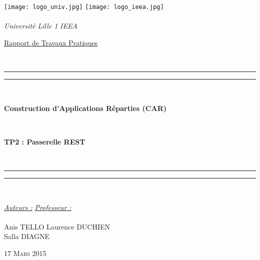 \thispagestyle{cover}

\texttt{[image: logo\_univ.jpg]} \hfill \texttt{[image: logo\_ieea.jpg]} \\
~\\
\hspace*{0.5cm} {\Large \textit{Université Lille 1}} \hfill {\Large \textit{IEEA}} \hspace*{0.5cm}\\

\vspace*{17mm}

\begin{center}
	\begin{Huge} \underline{Rapport de Travaux Pratiques} \end{Huge}\\[4mm]

	\vspace*{15mm}

	\rule[0.5ex]{\linewidth}{2pt}\vspace*{-\baselineskip}\vspace*{3.2pt}
	\rule[0.5ex]{\linewidth}{1pt}\\[\baselineskip]

		\begin{Huge} \textbf{Construction d'Applications Réparties (CAR)} \end{Huge}\\[4mm]
		\begin{Huge} \textbf{TP2 : Passerelle REST} \end{Huge}\\[4mm]

	\rule[0.5ex]{\linewidth}{1pt}\vspace*{-\baselineskip}\vspace{3.2pt}
	\rule[0.5ex]{\linewidth}{2pt}\\

	\vspace*{20mm}

	{\large \textit{\underline{Auteurs :}}} \hfill {\large \textit{\underline{Professeur :}}}\\
	~\\
	{\large Anis TELLO} \hfill {\large Laurence DUCHIEN}\\
	{\large Salla DIAGNE} \hfill {\large}
	
	\vspace*{20mm}
	
	{\large\textsc{17 Mars 2015}}
\end{center}